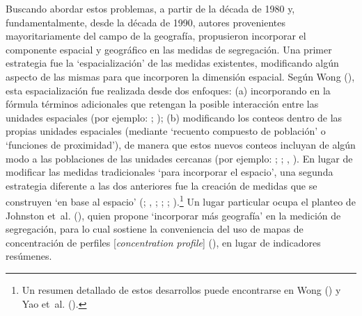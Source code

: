 \documentclass[
  spanish,
  a4paper,%
  chapterprefix=true,%
  DIV=calc,%
  twoside]{scrbook}%
\begin{document}
Buscando abordar estos problemas, a partir de la década de 1980 y,
fundamentalmente, desde la década de 1990, autores provenientes
mayoritariamente del campo de la geografía, propusieron incorporar el
componente espacial y geográfico en las medidas de segregación. Una
primer estrategia fue la `espacialización' de las medidas existentes,
modificando algún aspecto de las mismas para que incorporen la dimensión
espacial. Según Wong (), esta espacialización fue
realizada desde dos enfoques: (a) incorporando en la fórmula términos
adicionales que retengan la posible interacción entre las unidades
espaciales (por ejemplo: ; ); (b) modificando los
conteos dentro de las propias unidades espaciales (mediante `recuento
compuesto de población' o `funciones de proximidad'), de manera que
estos nuevos conteos incluyan de algún modo a las poblaciones de las
unidades cercanas (por ejemplo: ; ; , ). En lugar de modificar las medidas tradicionales `para
incorporar el espacio', una segunda estrategia diferente a las dos
anteriores fue la creación de medidas que se construyen `en base al
espacio' (; , ; ; ; ).\footnote{Un resumen detallado de estos desarrollos puede
  encontrarse en Wong () y Yao et~al. ().} Un lugar particular ocupa el
planteo de Johnston et~al. (), quien propone `incorporar más geografía' en la
medición de segregación, para lo cual sostiene la conveniencia del uso
de mapas de concentración de perfiles {[}\emph{concentration profile}{]}
(), en lugar de indicadores resúmenes.
\end{document}
